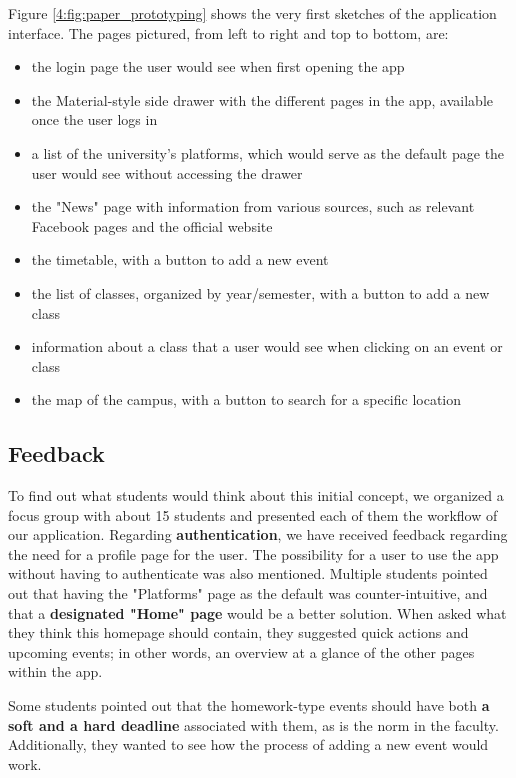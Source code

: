 Figure \ref{4:fig:paper_prototyping} shows the very first sketches of the application interface. The pages pictured, from left to right and top to bottom, are:
\begin{itemize}
    \setlength{\topsep}{0.5pt}
    \setlength{\itemsep}{0.5pt}
    \setlength{\parsep}{0.5pt}
    \item the login page the user would see when first opening the app
    \item the Material\cite{google2020material}-style side drawer with the different pages in the app, available once the user logs in
    \item a list of the university's platforms, which would serve as the default page the user would see without accessing the drawer
    \item the "News" page with information from various sources, such as relevant Facebook pages and the official website
    \item the timetable, with a button to add a new event
    \item the list of classes, organized by year/semester, with a button to add a new class
    \item information about a class that a user would see when clicking on an event or class
    \item the map of the campus, with a button to search for a specific location
\end{itemize}

\subsection{Feedback} \label{4:paper_feedback}

To find out what students would think about this initial concept, we organized a focus group with about 15 students and presented each of them the workflow of our application. Regarding \textbf{authentication}, we have received feedback regarding the need for a profile page for the user. The possibility for a user to use the app without having to authenticate was also mentioned. Multiple students pointed out that having the "Platforms" page as the default was counter-intuitive, and that a \textbf{designated "Home" page} would be a better solution. When asked what they think this homepage should contain, they suggested quick actions and upcoming events; in other words, an overview at a glance of the other pages within the app.

Some students pointed out that the homework-type events should have both \textbf{a soft and a hard deadline} associated with them, as is the norm in the faculty. Additionally, they wanted to see how the process of adding a new event would work.

